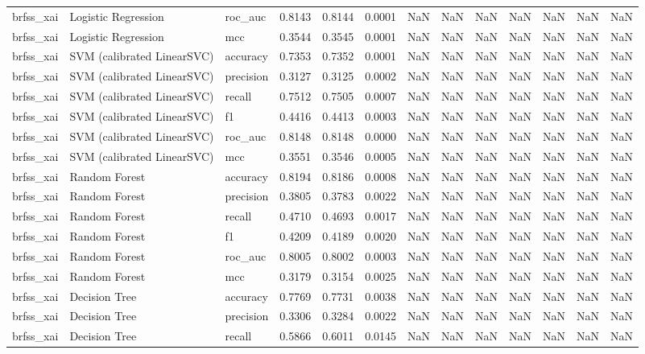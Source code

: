 \begin{tabular}{lllrrrllrrrrr}
brfss\_xai & Logistic Regression & roc\_auc & 0.8143 & 0.8144 & 0.0001 & NaN & NaN & NaN & NaN & NaN & NaN & NaN \\
brfss\_xai & Logistic Regression & mcc & 0.3544 & 0.3545 & 0.0001 & NaN & NaN & NaN & NaN & NaN & NaN & NaN \\
brfss\_xai & SVM (calibrated LinearSVC) & accuracy & 0.7353 & 0.7352 & 0.0001 & NaN & NaN & NaN & NaN & NaN & NaN & NaN \\
brfss\_xai & SVM (calibrated LinearSVC) & precision & 0.3127 & 0.3125 & 0.0002 & NaN & NaN & NaN & NaN & NaN & NaN & NaN \\
brfss\_xai & SVM (calibrated LinearSVC) & recall & 0.7512 & 0.7505 & 0.0007 & NaN & NaN & NaN & NaN & NaN & NaN & NaN \\
brfss\_xai & SVM (calibrated LinearSVC) & f1 & 0.4416 & 0.4413 & 0.0003 & NaN & NaN & NaN & NaN & NaN & NaN & NaN \\
brfss\_xai & SVM (calibrated LinearSVC) & roc\_auc & 0.8148 & 0.8148 & 0.0000 & NaN & NaN & NaN & NaN & NaN & NaN & NaN \\
brfss\_xai & SVM (calibrated LinearSVC) & mcc & 0.3551 & 0.3546 & 0.0005 & NaN & NaN & NaN & NaN & NaN & NaN & NaN \\
brfss\_xai & Random Forest & accuracy & 0.8194 & 0.8186 & 0.0008 & NaN & NaN & NaN & NaN & NaN & NaN & NaN \\
brfss\_xai & Random Forest & precision & 0.3805 & 0.3783 & 0.0022 & NaN & NaN & NaN & NaN & NaN & NaN & NaN \\
brfss\_xai & Random Forest & recall & 0.4710 & 0.4693 & 0.0017 & NaN & NaN & NaN & NaN & NaN & NaN & NaN \\
brfss\_xai & Random Forest & f1 & 0.4209 & 0.4189 & 0.0020 & NaN & NaN & NaN & NaN & NaN & NaN & NaN \\
brfss\_xai & Random Forest & roc\_auc & 0.8005 & 0.8002 & 0.0003 & NaN & NaN & NaN & NaN & NaN & NaN & NaN \\
brfss\_xai & Random Forest & mcc & 0.3179 & 0.3154 & 0.0025 & NaN & NaN & NaN & NaN & NaN & NaN & NaN \\
brfss\_xai & Decision Tree & accuracy & 0.7769 & 0.7731 & 0.0038 & NaN & NaN & NaN & NaN & NaN & NaN & NaN \\
brfss\_xai & Decision Tree & precision & 0.3306 & 0.3284 & 0.0022 & NaN & NaN & NaN & NaN & NaN & NaN & NaN \\
brfss\_xai & Decision Tree & recall & 0.5866 & 0.6011 & 0.0145 & NaN & NaN & NaN & NaN & NaN & NaN & NaN \\

\end{tabular}
